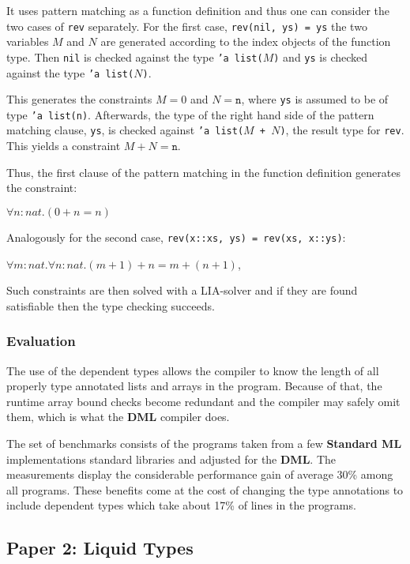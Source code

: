 \documentclass[a4paper,UKenglish]{lipics-v2016}
\begin{document}
It uses pattern matching as a function definition and thus one can consider the
two cases of \texttt{rev} separately. For the first case, \texttt{rev(nil, ys)
= ys} the two variables $M$ and $N$ are generated according to the index
objects of the function type. Then \texttt{nil} is checked against the type
\texttt{'a list($M$)} and \texttt{ys} is checked against the type \texttt{'a
list($N$)}.

This generates the constraints $M = 0$ and $N = \texttt{n}$, where \texttt{ys}
is assumed to be of type \texttt{'a list(n)}. Afterwards, the type of the right
hand side of the pattern matching clause, \texttt{ys}, is checked against
\texttt{'a list($M$ + $N$)}, the result type for \texttt{rev}. This yields a
constraint $M + N = \texttt{n}$.

Thus, the first clause of the pattern matching in the function definition
generates the constraint:

$\forall n : nat. (0 + n = n)$

Analogously for the second case, \texttt{rev(x::xs, ys) = rev(xs, x::ys)}:

$\forall m : nat. \forall n : nat.(m + 1) + n = m + (n + 1)$,

Such constraints are then solved with a LIA-solver and if they are found
satisfiable then the type checking succeeds.

\subsubsection{Evaluation}

The use of the dependent types allows the compiler to know the length of all
properly type annotated lists and arrays in the program. Because of that, the
runtime array bound checks become redundant and the compiler may safely omit
them, which is what the \textbf{DML} compiler does.

The set of benchmarks consists of the programs taken from a few
\textbf{Standard ML} implementations standard libraries and adjusted for the
\textbf{DML}. The measurements display the considerable performance gain of
average 30\% among all programs.  These benefits come at the cost of changing
the type annotations to include dependent types which take about 17\% of lines
in the programs.

\subsection{Paper 2: Liquid Types}
\end{document}
